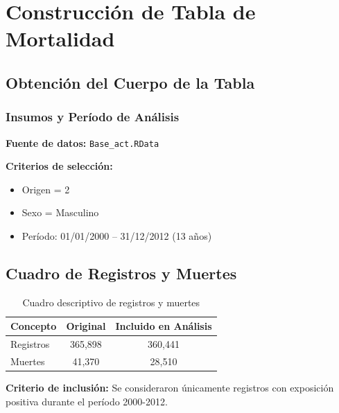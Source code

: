 \clearpage

\section{Construcción de Tabla de Mortalidad}

\subsection{Obtención del Cuerpo de la Tabla}

\subsubsection{Insumos y Período de Análisis}

\textbf{Fuente de datos:} \texttt{Base\_act.RData}

\textbf{Criterios de selección:}
\begin{itemize}
    \item Origen = 2
    \item Sexo = Masculino
    \item Período: 01/01/2000 -- 31/12/2012 (13 años)
\end{itemize}

\subsection{Cuadro de Registros y Muertes}

\begin{table}[H]
\centering
\caption{Cuadro descriptivo de registros y muertes}
\label{tab:registros_muertes}
\begin{tabular}{lcc}
\toprule
\tableheadercolor
\textbf{Concepto} & \textbf{Original} & \textbf{Incluido en Análisis} \\
\midrule
Registros & 365,898 & 360,441 \\
Muertes & 41,370 & 28,510 \\
\bottomrule
\end{tabular}
\end{table}

\textbf{Criterio de inclusión:} Se consideraron únicamente registros con exposición positiva durante el período 2000-2012.

